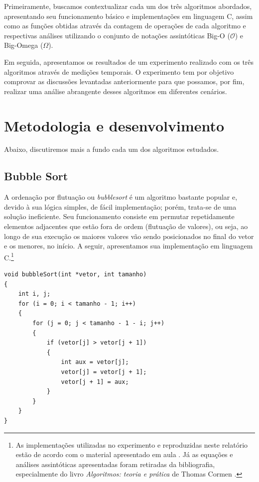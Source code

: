 \documentclass[fontsize=10pt]{article}
\begin{document}
    \quad Primeiramente, buscamos contextualizar cada um dos três algoritmos abordados, apresentando seu funcionamento básico e implementações em linguagem C, assim como as funções obtidas através da contagem de operações de cada algoritmo e respectivas análises utilizando o conjunto de notações assintóticas Big-O ($\mathcal{O}$) e Big-Omega ($\Omega$).
    
    \quad Em seguida, apresentamos os resultados de um experimento realizado com os três algoritmos através de medições temporais. O experimento tem por objetivo comprovar as discussões levantadas anteriormente para que possamos, por fim, realizar uma análise abrangente desses algoritmos em diferentes cenários.


\section{Metodologia e desenvolvimento}

\quad Abaixo, discutiremos mais a fundo cada um dos algoritmos estudados.

\subsection{Bubble Sort}

\quad A ordenação por flutuação ou \textit{bubblesort} é um algoritmo bastante popular e, devido à sua lógica simples, de fácil implementação; porém, trata-se de uma solução ineficiente. Seu funcionamento consiste em permutar repetidamente elementos adjacentes que estão fora de ordem (flutuação de valores), ou seja, ao longo de sua execução os maiores valores vão sendo posicionados no final do vetor e os menores, no início. A seguir, apresentamos sua implementação em linguagem C.\footnote{As implementações utilizadas no experimento e reproduzidas neste relatório estão de acordo com o material apresentado em aula \cite{lab}. Já as equações e análises assintóticas apresentadas foram retiradas da bibliografia, especialmente do livro \textit{Algoritmos: teoria e prática} de Thomas Cormen \cite{cormen}.}

\begin{lstlisting}
void bubbleSort(int *vetor, int tamanho)
{
    int i, j;
    for (i = 0; i < tamanho - 1; i++)
    {
        for (j = 0; j < tamanho - 1 - i; j++)
        {
            if (vetor[j] > vetor[j + 1])
            {
                int aux = vetor[j];
                vetor[j] = vetor[j + 1];
                vetor[j + 1] = aux;
            }
        }
    }
}
\end{lstlisting}
\end{document}
